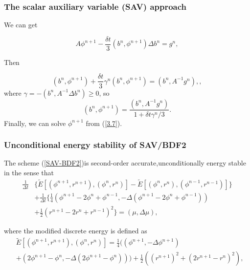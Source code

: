\documentclass{beamer}
\begin{document}
    \begin{frame}
\frametitle{The scalar auxiliary variable (SAV) approach}
We can get

\begin{equation}\label{3.7}
  A\phi^{n+1}-\frac{\delta t}{3}(b^n, \phi^{n+1})\Delta b^n=g^n,
\end{equation}

Then

\begin{equation}\label{3.8}
  (b^n,\phi^{n+1})+\frac{\delta t}{3}\gamma^n(b^n,\phi^{n+1})=(b^n,A^{-1}g^n),,
\end{equation}
where $\gamma=-(b^n,A^{-1}\Delta b^n)\geq 0$, so
\begin{equation}\label{3.9}
  (b^n,\phi^{n+1})=\frac{(b^n,A^{-1}g^n)}{1+\delta t\gamma^n/3}.
\end{equation}
Finally, we can solve $\phi^{n+1}$ from (\ref{3.7}).

    \end{frame}
    \begin{frame}
\frametitle{Unconditional energy stability of SAV/BDF2}

The scheme (\ref{SAV-BDF2})is second-order accurate,unconditionally energy stable in the sense that
\begin{equation}\label{the2.2}
  \begin{split}
     \frac{1}{\Delta t} & \{ \tilde{E}[ (\phi^{n+1},r^{n+1}),(\phi^n,r^n) ]-\tilde{E}[ (\phi^{n},r^{n}),(\phi^{n-1},r^{n-1}) ] \}\\
       & +\frac{1}{\Delta t}\{ \frac{1}{4}(\phi^{n+1}-2\phi^n+\phi^{n-1},-\Delta(\phi^{n+1}-2\phi^n+\phi^{n-1}))\\
       & +\frac{1}{2}(r^{n+1}-2r^n+r^{n-1})^2 \}=(\mu,\Delta \mu), 
  \end{split}
\end{equation}

where the modified discrete energy is defined as
\begin{equation}\label{the2.2.2}
  \begin{split}
     &\tilde{E}[(\phi^{n+1},r^{n+1}),(\phi^n,r^n)]=\frac{1}{4}((\phi^{n+1},-\Delta\phi^{n+1})\\
     &+(2\phi^{n+1}-\phi^n,-\Delta(2\phi^{n+1}-\phi^n)))+\frac{1}{2}\left((r^{n+1})^2+(2r^{n+1}-r^n)^2\right),
  \end{split}
\end{equation}
    \end{frame}
\end{document}
